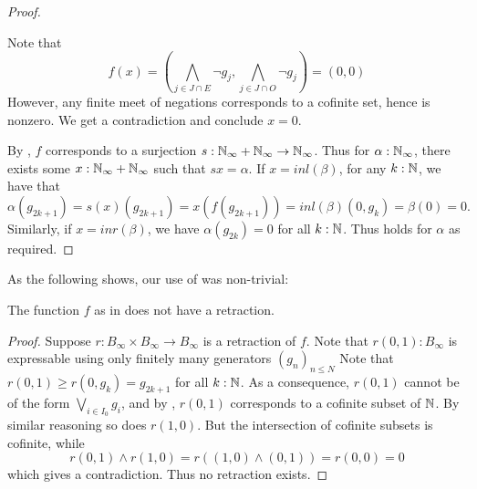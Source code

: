 \begin{proof}
\begin{itemize}
      Note that   
      $$f(x) = (\bigwedge_{j\in J \cap E } \neg g_j , \bigwedge_{j\in J \cap O } \neg g_j ) = (0,0)$$
      However, any finite meet of negations corresponds to a cofinite set, hence is nonzero. 
      We get a contradiction and conclude $x=0$. 
  \end{itemize}
  By ,
  $f$ corresponds to a surjection 
  $s:\mathbb{N}_{\infty} + \mathbb{N}_{\infty} \to \mathbb{N}_{\infty}$.
  Thus for $\alpha : \mathbb{N}_{\infty}$, 
  there exists some $x:\mathbb{N}_{\infty} + \mathbb{N}_{\infty}$ such that $s x = \alpha$. 
  If $x = inl(\beta)$, 
  for any $k:\mathbb{N}$, we have that 
  $$\alpha (g_{2k+1}) = s(x) (g_{2k+1}) = x(f(g_{2k+1})) = inl(\beta) (0,g_k)  = \beta(0) = 0.$$
  Similarly, if $x = inr(\beta)$, we have $\alpha(g_{2k}) = 0$ for all $k:\mathbb{N}$. 
  Thus  holds for $\alpha$ as required. 
\end{proof}
As the following shows, our use of  was non-trivial: 
\begin{lemma}
  The function $f$  as in  does not have a retraction. 
\end{lemma}
\begin{proof}
  Suppose $r:B_\infty \times B_\infty \to B_\infty$ is a retraction of $f$. 
  Note that $r(0,1):B_\infty$ is expressable using only finitely many generators $(g_n)_{n\leq N}$
  Note that $r(0,1) \geq r(0,g_k) = g_{2k+1}$ for all $k:\mathbb{N}$. 
  As a consequence, $r(0,1)$ cannot be of the form $\bigvee_{i\in I_0} g_i$, and by , 
  $r(0,1)$ corresponds to a cofinite subset of $\mathbb{N}$. %
  By similar reasoning so does $r(1,0)$.%
  But the intersection of cofinite subsets is cofinite, while 
  $$r(0,1) \wedge r(1,0) = r( (1,0) \wedge (0,1)) = r(0,0) = 0$$
  which gives a contradiction. Thus no retraction exists. 
\end{proof}


